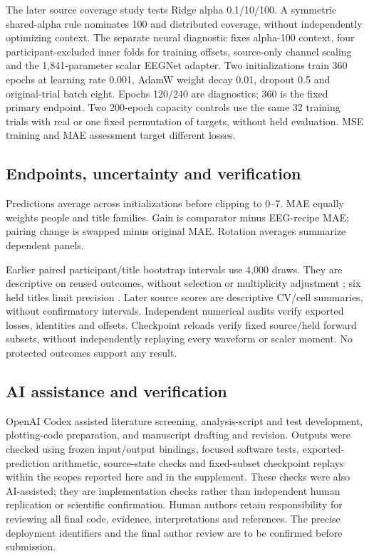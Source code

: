 \documentclass[12pt,a4paper]{article}
\begin{document}
The later source coverage study tests Ridge alpha 0.1/10/100. A symmetric shared-alpha rule nominates 100 and distributed coverage, without independently optimizing context. The separate neural diagnostic fixes alpha-100 context, four participant-excluded inner folds for training offsets, source-only channel scaling and the 1,841-parameter scalar EEGNet adapter. Two initializations train 360 epochs at learning rate 0.001, AdamW weight decay 0.01, dropout 0.5 and original-trial batch eight. Epochs 120/240 are diagnostics; 360 is the fixed primary endpoint. Two 200-epoch capacity controls use the same 32 training trials with real or one fixed permutation of targets, without held evaluation. MSE training and MAE assessment target different losses.

\subsection{Endpoints, uncertainty and verification}
Predictions average across initializations before clipping to 0--7. MAE equally weights people and title families. Gain is comparator minus EEG-recipe MAE; pairing change is swapped minus original MAE. Rotation averages summarize dependent panels.

Earlier paired participant/title bootstrap intervals use 4,000 draws. They are descriptive on reused outcomes, without selection or multiplicity adjustment \cite{owen2007,owen2012}; six held titles limit precision \cite{westfall2014power}. Later source scores are descriptive CV/cell summaries, without confirmatory intervals. Independent numerical audits verify exported losses, identities and offsets. Checkpoint reloads verify fixed source/held forward subsets, without independently replaying every waveform or scaler moment. No protected outcomes support any result.

\subsection{AI assistance and verification}
OpenAI Codex assisted literature screening, analysis-script and test development, plotting-code preparation, and manuscript drafting and revision. Outputs were checked using frozen input/output bindings, focused software tests, exported-prediction arithmetic, source-state checks and fixed-subset checkpoint replays within the scopes reported here and in the supplement. These checks were also AI-assisted; they are implementation checks rather than independent human replication or scientific confirmation. Human authors retain responsibility for reviewing all final code, evidence, interpretations and references. The precise deployment identifiers and the final author review are to be confirmed before submission.
\end{document}
